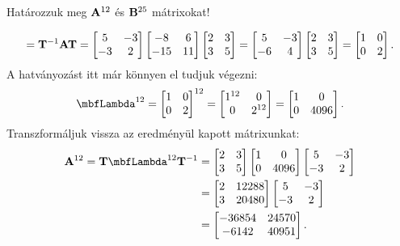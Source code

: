 \begin{exercise}{Határozzuk meg $\mathbf{A}^{12}$ és $\mathbf{B}^{25}$ mátrixokat!}
{\[    = \mathbf{T}^{-1} \mathbf{A} \mathbf{T}
    = \begin{bmatrix}
      5  & -3 \\
      -3 & 2
    \end{bmatrix} \begin{bmatrix}
      -8  & 6  \\
      -15 & 11
    \end{bmatrix} \begin{bmatrix}
      2 & 3 \\
      3 & 5
    \end{bmatrix}
    =
    \begin{bmatrix}
      5  & -3 \\
      -6 & 4
    \end{bmatrix} \begin{bmatrix}
      2 & 3 \\
      3 & 5
    \end{bmatrix}
    =
    \begin{bmatrix}
      1 & 0 \\
      0 & 2
    \end{bmatrix}
    \text.
  \]
  A hatványozást itt már könnyen el tudjuk végezni:
  \[
    \mbfLambda^{12}
    = \begin{bmatrix} 1 & 0 \\ 0 & 2 \end{bmatrix}^{12}
    = \begin{bmatrix} 1^{12} & 0 \\ 0 & 2^{12} \end{bmatrix}
    = \begin{bmatrix} 1 & 0 \\ 0 & 4096  \end{bmatrix}
    \text.
  \]
  Transzformáljuk vissza az eredményül kapott mátrixunkat:
  \begin{align*}
    \rmat A^{12} = \rmat T \mbfLambda^{12} \rmat T^{-1}
     & =
    \begin{bmatrix} 2 & 3 \\ 3 & 5 \end{bmatrix}
    \begin{bmatrix} 1 & 0 \\ 0 & 4096 \end{bmatrix}
    \begin{bmatrix} 5  & -3 \\ -3 & 2 \end{bmatrix}
    \\
     & =
    \begin{bmatrix} 2 & 12288 \\ 3 & 20480 \end{bmatrix}
    \begin{bmatrix} 5  & -3 \\ -3 & 2 \end{bmatrix}
    \\
     & =
    \begin{bmatrix}
      -36854 & 24570 \\
      -6142  & 40951
    \end{bmatrix}
    \text.
  \end{align*}

}
\end{exercise}
